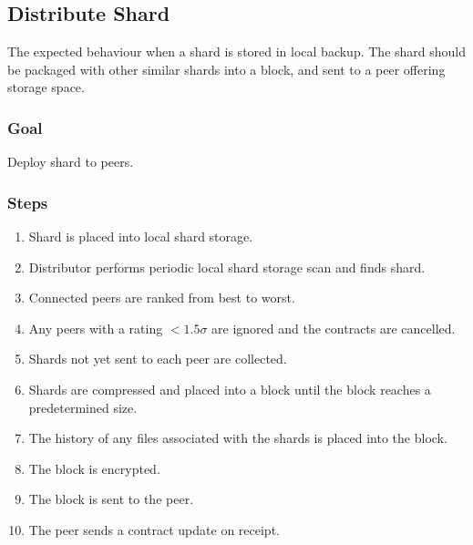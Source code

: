 \documentclass[11pt, a4paper, twoside]{report}
\begin{document}
\subsection{Distribute Shard}

The expected behaviour when a shard is stored in local backup. The shard should be packaged with other similar shards into a block, and sent to a peer offering storage space.

\subsubsection{Goal}

Deploy shard to peers.

\subsubsection{Steps}

\begin{enumerate}
 \item Shard is placed into local shard storage.
 \item Distributor performs periodic local shard storage scan and finds shard.
 \item Connected peers are ranked from best to worst.
 \item Any peers with a rating $<1.5 \sigma$ are ignored and the contracts are cancelled.
 \item Shards not yet sent to each peer are collected.
 \item Shards are compressed and placed into a block until the block reaches a predetermined size.
 \item The history of any files associated with the shards is placed into the block.
 \item The block is encrypted.
 \item The block is sent to the peer.
 \item The peer sends a contract update on receipt.
\end{enumerate}
\end{document}
